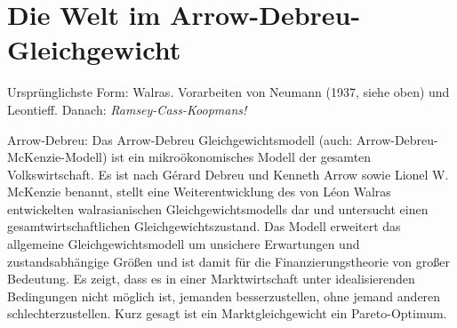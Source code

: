 \section{Die Welt im Arrow-Debreu-Gleichgewicht}
\label{Arrow-Debreu}
Ursprünglichste Form: Walras.
Vorarbeiten von Neumann (1937, siehe oben) und Leontieff. Danach: \textit{Ramsey-Cass-Koopmans!}

Arrow-Debreu:
Das Arrow-Debreu Gleichgewichtsmodell (auch: Arrow-Debreu-McKenzie-Modell) ist ein mikroökonomisches Modell der gesamten Volkswirtschaft. Es ist nach Gérard Debreu und Kenneth Arrow sowie Lionel W. McKenzie benannt, stellt eine Weiterentwicklung des von Léon Walras entwickelten walrasianischen Gleichgewichtsmodells dar und untersucht einen gesamtwirtschaftlichen Gleichgewichtszustand. 
Das Modell erweitert das allgemeine Gleichgewichtsmodell um unsichere Erwartungen und zustandsabhängige Größen und ist damit für die Finanzierungstheorie von großer Bedeutung. Es zeigt, dass es in einer Marktwirtschaft unter idealisierenden Bedingungen nicht möglich ist, jemanden besserzustellen, ohne jemand anderen schlechterzustellen. Kurz gesagt ist ein Marktgleichgewicht ein Pareto-Optimum. 















